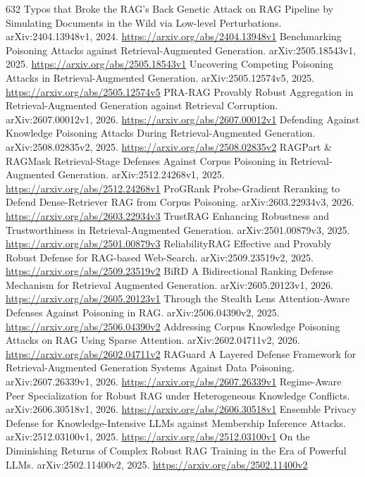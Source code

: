 \documentclass[11pt]{article}
\begin{document}
\begin{thebibliography}{632}
 Typos that Broke the RAG's Back Genetic Attack on RAG Pipeline by Simulating Documents in the Wild via Low-level Perturbations. arXiv:2404.13948v1, 2024. \url{https://arxiv.org/abs/2404.13948v1}
 Benchmarking Poisoning Attacks against Retrieval-Augmented Generation. arXiv:2505.18543v1, 2025. \url{https://arxiv.org/abs/2505.18543v1}
 Uncovering Competing Poisoning Attacks in Retrieval-Augmented Generation. arXiv:2505.12574v5, 2025. \url{https://arxiv.org/abs/2505.12574v5}
 PRA-RAG Provably Robust Aggregation in Retrieval-Augmented Generation against Retrieval Corruption. arXiv:2607.00012v1, 2026. \url{https://arxiv.org/abs/2607.00012v1}
 Defending Against Knowledge Poisoning Attacks During Retrieval-Augmented Generation. arXiv:2508.02835v2, 2025. \url{https://arxiv.org/abs/2508.02835v2}
 RAGPart \& RAGMask Retrieval-Stage Defenses Against Corpus Poisoning in Retrieval-Augmented Generation. arXiv:2512.24268v1, 2025. \url{https://arxiv.org/abs/2512.24268v1}
 ProGRank Probe-Gradient Reranking to Defend Dense-Retriever RAG from Corpus Poisoning. arXiv:2603.22934v3, 2026. \url{https://arxiv.org/abs/2603.22934v3}
 TrustRAG Enhancing Robustness and Trustworthiness in Retrieval-Augmented Generation. arXiv:2501.00879v3, 2025. \url{https://arxiv.org/abs/2501.00879v3}
 ReliabilityRAG Effective and Provably Robust Defense for RAG-based Web-Search. arXiv:2509.23519v2, 2025. \url{https://arxiv.org/abs/2509.23519v2}
 BiRD A Bidirectional Ranking Defense Mechanism for Retrieval Augmented Generation. arXiv:2605.20123v1, 2026. \url{https://arxiv.org/abs/2605.20123v1}
 Through the Stealth Lens Attention-Aware Defenses Against Poisoning in RAG. arXiv:2506.04390v2, 2025. \url{https://arxiv.org/abs/2506.04390v2}
 Addressing Corpus Knowledge Poisoning Attacks on RAG Using Sparse Attention. arXiv:2602.04711v2, 2026. \url{https://arxiv.org/abs/2602.04711v2}
 RAGuard A Layered Defense Framework for Retrieval-Augmented Generation Systems Against Data Poisoning. arXiv:2607.26339v1, 2026. \url{https://arxiv.org/abs/2607.26339v1}
 Regime-Aware Peer Specialization for Robust RAG under Heterogeneous Knowledge Conflicts. arXiv:2606.30518v1, 2026. \url{https://arxiv.org/abs/2606.30518v1}
 Ensemble Privacy Defense for Knowledge-Intensive LLMs against Membership Inference Attacks. arXiv:2512.03100v1, 2025. \url{https://arxiv.org/abs/2512.03100v1}
 On the Diminishing Returns of Complex Robust RAG Training in the Era of Powerful LLMs. arXiv:2502.11400v2, 2025. \url{https://arxiv.org/abs/2502.11400v2}

\end{thebibliography}
\end{document}
